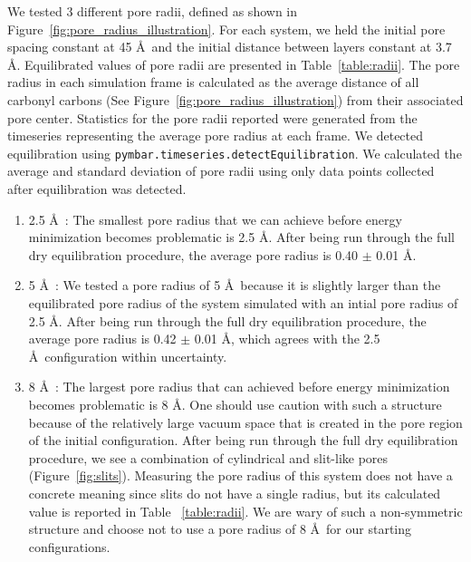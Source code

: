 \documentclass[journal=jpcbfk,manusciprt=article]{achemso}
\begin{document}
	  We tested 3 different pore radii, defined as shown in
	  Figure~\ref{fig:pore_radius_illustration}. For each system, we held the initial
	  pore spacing constant at 45 \AA~and the initial distance between layers
	  constant at 3.7 \AA. Equilibrated values of pore radii are presented in
	  Table~\ref{table:radii}. The pore radius in each simulation frame is calculated
	  as the average distance of all carbonyl carbons (See
	  Figure~\ref{fig:pore_radius_illustration}) from their associated pore center.
	  Statistics for the pore radii reported were generated from the timeseries
	  representing the average pore radius at each frame. We detected equilibration
	  using \texttt{pymbar.timeseries.detectEquilibration}. We calculated the average
	  and standard deviation of pore radii using only data points collected after
	  equilibration was detected.

	  \begin{enumerate}

		\item 2.5 \AA~: The smallest pore radius that we can achieve
		before energy minimization becomes problematic is 2.5 \AA. After being run
		through the full dry equilibration procedure, the average pore radius is 0.40
		$\pm$ 0.01 \AA.

		\item 5 \AA~: We tested a pore radius of 5 \AA~because it is
		slightly larger than the equilibrated pore radius of the system simulated with
		an intial pore radius of 2.5 \AA. After being run through the full dry
		equilibration procedure, the average pore radius is 0.42 $\pm$ 0.01 \AA, which
		agrees with the 2.5 \AA~configuration within uncertainty. 

		\item 8 \AA~: The largest pore radius that can achieved before
		energy minimization becomes problematic is 8 \AA. One should use caution with
		such a structure because of the relatively large vacuum space that is created
		in the pore region of the initial configuration. After being run through the
		full dry equilibration procedure, we see a combination of cylindrical and
		slit-like pores (Figure~\ref{fig:slits}). Measuring the pore radius of this
		system does not have a concrete meaning since slits do not have a single
		radius, but its calculated value is reported in Table ~\ref{table:radii}. We
		are wary of such a non-symmetric structure and choose not to use a pore radius
		of 8 \AA~for our starting configurations. 
	  
	  \end{enumerate}
\end{document}

